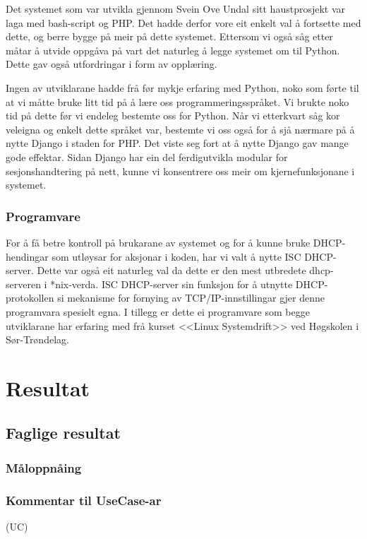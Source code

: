 \documentclass[nynorsk,12pt,a4paper,oneside]{book}
\begin{document}
Det systemet som var utvikla gjennom Svein Ove Undal sitt haustprosjekt var laga med bash-script og PHP. Det hadde derfor vore eit enkelt val å fortsette med dette, og berre bygge på meir på dette systemet. Ettersom vi også såg etter måtar å utvide oppgåva på vart det naturleg å legge systemet om til Python. Dette gav også utfordringar i form av opplæring.

Ingen av utviklarane hadde frå før mykje erfaring med Python, noko som førte til at vi måtte bruke litt tid på å lære oss programmeringsspråket. Vi brukte noko tid på dette før vi endeleg bestemte oss for Python. Når vi etterkvart såg kor veleigna og enkelt dette språket var, bestemte vi oss også for å sjå nærmare på å nytte Django i staden for PHP. Det viste seg fort at å nytte Django gav mange gode effektar. Sidan Django har ein del ferdigutvikla modular for sesjonshandtering på nett, kunne vi konsentrere oss meir om kjernefunksjonane i systemet.

\subsection{Programvare}

For å få betre kontroll på brukarane av systemet og for å kunne bruke DHCP-hendingar som utløysar for aksjonar i koden, har vi valt å nytte ISC DHCP-server. Dette var også eit naturleg val da dette er den mest utbredete dhcp-serveren i *nix-verda. ISC DHCP-server sin funksjon for å utnytte DHCP-protokollen si mekanisme for fornying av TCP/IP-innstillingar gjer denne programvara spesielt egna. I tillegg er dette ei programvare som begge utviklarane har erfaring med frå kurset <<Linux Systemdrift>> ved Høgskolen i Sør-Trøndelag. 

\chapter{Resultat}

\section{Faglige resultat}
\subsection{Måloppnåing}
	
\subsection{Kommentar til UseCase-ar}
(UC)
\end{document}
